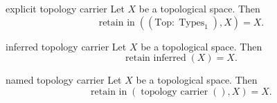 \begin{cleanresult}{explicit topology carrier}
Let $X$ be a topological space.
Then \[\operatorname{retain\ in}(\left(\mathrm{Top} : \operatorname{Types}_1\right), X)=X.\]
\end{cleanresult}

\begin{cleanresult}{inferred topology carrier}
Let $X$ be a topological space.
Then \[\operatorname{retain\ inferred}(X)=X.\]
\end{cleanresult}

\begin{cleanresult}{named topology carrier}
Let $X$ be a topological space.
Then \[\operatorname{retain\ in}(\operatorname{topology\ carrier}(), X)=X.\]
\end{cleanresult}

